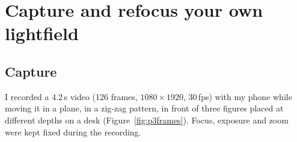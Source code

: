 \documentclass[11pt]{article}
\begin{document}
\clearpage
\section{Capture and refocus your own lightfield}
\subsection*{Capture}
I recorded a 4.2\,s video (126 frames, $1080\times1920$, 30\,fps) with my phone while moving it in a plane, in a zig-zag pattern, in front of three figures placed at different depths on a desk (Figure~\ref{fig:p3frames}). Focus, exposure and zoom were kept fixed during the recording.
\end{document}
